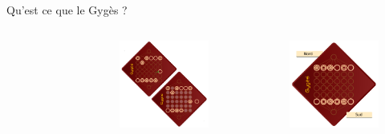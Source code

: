 \documentclass{beamer}
\begin{document}
\begin{frame}{Qu’est ce que le Gygès ?}
\begin{columns}
{{{\begin{figure}[h!]
							\end{figure}
						} {
							\alt<8> {
								\begin{figure}[h!]
									\centering
									\includegraphics[width=\textwidth]{images/Rempl.png}
								\end{figure}
							} {
								\uncover<2> {
									\begin{figure}[h]
										\centering
										\includegraphics[width=\textwidth]{images/Gyges.png}
									\end{figure}
								}
							}
						}
					}
				}
		\end{columns}
	\end{frame}
\end{document}

